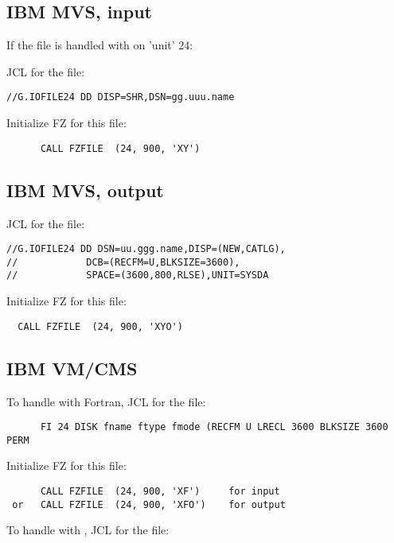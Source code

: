 \subsection*{IBM MVS, input}

If the file is handled with  on 'unit' 24:

JCL for the file:

\begin{verbatim}
//G.IOFILE24 DD DISP=SHR,DSN=gg.uuu.name
\end{verbatim}

Initialize FZ for this file:

\begin{verbatim}
      CALL FZFILE  (24, 900, 'XY')
\end{verbatim}

\subsection*{IBM MVS, output}

JCL for the file:

\begin{verbatim}
//G.IOFILE24 DD DSN=uu.ggg.name,DISP=(NEW,CATLG),
//            DCB=(RECFM=U,BLKSIZE=3600),
//            SPACE=(3600,800,RLSE),UNIT=SYSDA
\end{verbatim}

Initialize FZ for this file:

\begin{verbatim}
  CALL FZFILE  (24, 900, 'XYO')
\end{verbatim}

\subsection*{IBM VM/CMS}


To handle with Fortran, JCL for the file:

\begin{verbatim}
      FI 24 DISK fname ftype fmode (RECFM U LRECL 3600 BLKSIZE 3600 PERM
\end{verbatim}

Initialize FZ for this file:

\begin{verbatim}
      CALL FZFILE  (24, 900, 'XF')     for input
 or   CALL FZFILE  (24, 900, 'XFO')    for output
\end{verbatim}


To handle with , JCL for the file:


